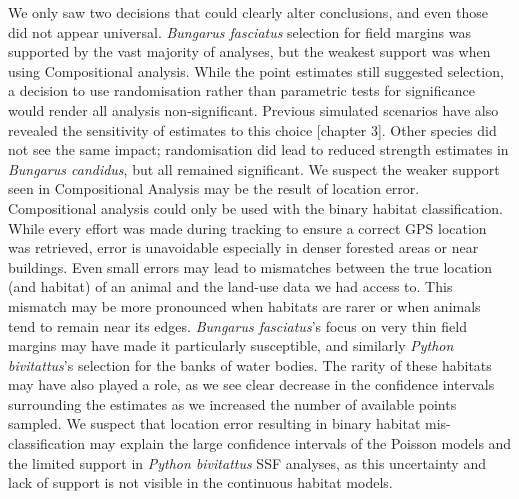 \documentclass[10pt,a4paper]{article}
\begin{document}
We only saw two decisions that could clearly alter conclusions, and even those did not appear universal.
\emph{Bungarus fasciatus} selection for field margins was supported by the vast majority of analyses, but the weakest support was when using Compositional analysis.
While the point estimates still suggested selection, a decision to use randomisation rather than parametric tests for significance would render all analysis non-significant.
Previous simulated scenarios have also revealed the sensitivity of estimates to this choice {[}chapter 3{]}.
Other species did not see the same impact; randomisation did lead to reduced strength estimates in \emph{Bungarus candidus}, but all remained significant.
We suspect the weaker support seen in Compositional Analysis may be the result of location error.
Compositional analysis could only be used with the binary habitat classification.
While every effort was made during tracking to ensure a correct GPS location was retrieved, error is unavoidable especially in denser forested areas or near buildings.
Even small errors may lead to mismatches between the true location (and habitat) of an animal and the land-use data we had access to.
This mismatch may be more pronounced when habitats are rarer or when animals tend to remain near its edges.
\emph{Bungarus fasciatus}'s focus on very thin field margins may have made it particularly susceptible, and similarly \emph{Python bivitattus}'s selection for the banks of water bodies.
The rarity of these habitats may have also played a role, as we see clear decrease in the confidence intervals surrounding the estimates as we increased the number of available points sampled.
We suspect that location error resulting in binary habitat mis-classification may explain the large confidence intervals of the Poisson models and the limited support in \emph{Python bivitattus} SSF analyses, as this uncertainty and lack of support is not visible in the continuous habitat models.
\end{document}
